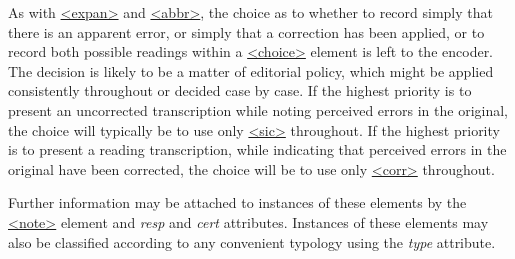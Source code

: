 As with \hyperref[TEI.expan]{<expan>} and \hyperref[TEI.abbr]{<abbr>}, the choice as to whether to record simply that there is an apparent error, or simply that a correction has been applied, or to record both possible readings within a \hyperref[TEI.choice]{<choice>} element is left to the encoder. The decision is likely to be a matter of editorial policy, which might be applied consistently throughout or decided case by case. If the highest priority is to present an uncorrected transcription while noting perceived errors in the original, the choice will typically be to use only \hyperref[TEI.sic]{<sic>} throughout. If the highest priority is to present a reading transcription, while indicating that perceived errors in the original have been corrected, the choice will be to use only \hyperref[TEI.corr]{<corr>} throughout.\par
Further information may be attached to instances of these elements by the \hyperref[TEI.note]{<note>} element and {\itshape resp} and {\itshape cert} attributes. Instances of these elements may also be classified according to any convenient typology using the {\itshape type} attribute.\par
